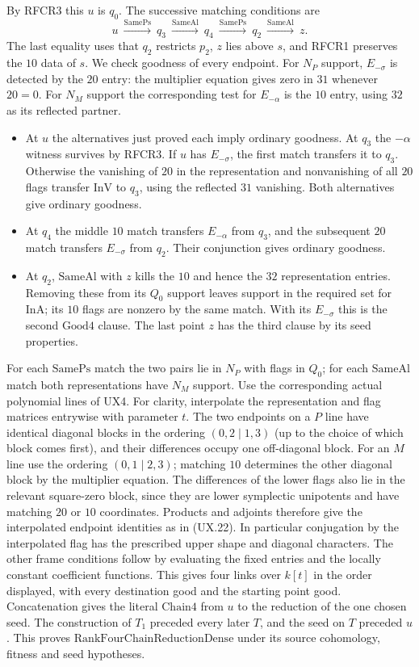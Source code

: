 By RFCR3 this $u$ is $q_0$. The successive matching conditions are
\[
 u\ \xrightarrow{\mathrm{SamePs}}\ q_3\
   \xrightarrow{\mathrm{SameAl}}\ q_4\
   \xrightarrow{\mathrm{SamePs}}\ q_2\
   \xrightarrow{\mathrm{SameAl}}\ z .
\]
The last equality uses that $q_2$ restricts $p_2$, $z$ lies above $s$,
and RFCR1 preserves the $10$ data of $s$. We check goodness of every
endpoint. For $N_P$ support, $E_{-\sigma}$ is detected by the $20$
entry: the multiplier equation gives zero in $31$ whenever $20=0$.
For $N_M$ support the corresponding test for $E_{-\alpha}$ is the
$10$ entry, using $32$ as its reflected partner.
\begin{itemize}
\item At $u$ the alternatives just proved each imply ordinary goodness.
At $q_3$ the $-\alpha$ witness survives by RFCR3. If $u$ has
$E_{-\sigma}$, the first match transfers it to $q_3$. Otherwise
the vanishing of $20$ in the representation and nonvanishing of all
$20$ flags transfer $\mathrm{InV}$ to $q_3$, using the reflected
$31$ vanishing. Both alternatives give ordinary goodness.
\item At $q_4$ the middle $10$ match transfers $E_{-\alpha}$ from
$q_3$, and the subsequent $20$ match transfers $E_{-\sigma}$ from
$q_2$. Their conjunction gives ordinary goodness.
\item At $q_2$, $\mathrm{SameAl}$ with $z$ kills the $10$ and hence
the $32$ representation entries. Removing these from its $Q_0$
support leaves support in the required set for $\mathrm{InA}$;
its $10$ flags are nonzero by the same match. With its
$E_{-\sigma}$ this is the second $\mathrm{Good4}$ clause.
The last point $z$ has the third clause by its seed properties.
\end{itemize}
For each $\mathrm{SamePs}$ match the two pairs lie in $N_P$ with
flags in $Q_0$; for each $\mathrm{SameAl}$ match both representations
have $N_M$ support. Use the corresponding actual polynomial lines
of UX4. For clarity, interpolate the representation and flag matrices
entrywise with parameter $t$. The two endpoints on a $P$ line have
identical diagonal blocks in the ordering $(0,2\mid 1,3)$ (up to
the choice of which block comes first), and their differences occupy
one off-diagonal block. For an $M$ line use the ordering
$(0,1\mid2,3)$; matching $10$ determines the other diagonal block by
the multiplier equation. The differences of the lower flags also
lie in the relevant square-zero block, since they are lower
symplectic unipotents and have matching $20$ or $10$ coordinates.
Products and adjoints therefore give the interpolated endpoint
identities as in (UX.22). In particular conjugation by the interpolated
flag has the prescribed upper shape and diagonal characters. The other
frame conditions follow by evaluating the fixed entries and the
locally constant coefficient functions. This gives four links over
$k[t]$ in the order displayed, with every destination good and the
starting point good. Concatenation gives the literal $\mathrm{Chain4}$
from $u$ to the reduction of the one chosen seed. The construction
of $T_1$ preceded every later $T$, and the seed on $T$ preceded $u$.
This proves $\mathrm{RankFourChainReductionDense}$ under its source
cohomology, fitness and seed hypotheses.
